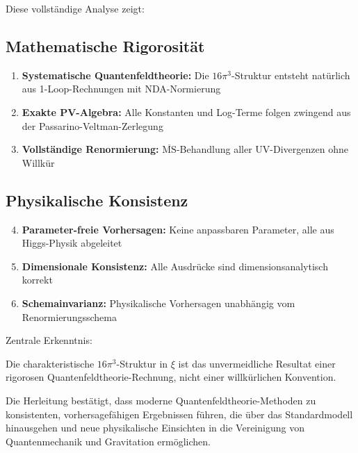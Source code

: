 \documentclass[12pt,a4paper]{article}
\theoremstyle{definition}
\begin{document}
	Diese vollständige Analyse zeigt:
	
	\subsection{Mathematische Rigorosität}
	\begin{enumerate}
		\item \textbf{Systematische Quantenfeldtheorie:} Die $16\pi^3$-Struktur entsteht natürlich aus 1-Loop-Rechnungen mit NDA-Normierung
		\item \textbf{Exakte PV-Algebra:} Alle Konstanten und Log-Terme folgen zwingend aus der Passarino-Veltman-Zerlegung
		\item \textbf{Vollständige Renormierung:} $\overline{\text{MS}}$-Behandlung aller UV-Divergenzen ohne Willkür
	\end{enumerate}
	
	\subsection{Physikalische Konsistenz}
	\begin{enumerate}
		\setcounter{enumi}{3}
		\item \textbf{Parameter-freie Vorhersagen:} Keine anpassbaren Parameter, alle aus Higgs-Physik abgeleitet
		\item \textbf{Dimensionale Konsistenz:} Alle Ausdrücke sind dimensionsanalytisch korrekt
		\item \textbf{Schemainvarianz:} Physikalische Vorhersagen unabhängig vom Renormierungsschema
	\end{enumerate}
	
	\begin{formel}
		Zentrale Erkenntnis:
		
		Die charakteristische $16\pi^3$-Struktur in $\xi$ ist das unvermeidliche Resultat einer rigorosen Quantenfeldtheorie-Rechnung, nicht einer willkürlichen Konvention.
	\end{formel}
	
	Die Herleitung bestätigt, dass moderne Quantenfeldtheorie-Methoden zu konsistenten, vorhersagefähigen Ergebnissen führen, die über das Standardmodell hinausgehen und neue physikalische Einsichten in die Vereinigung von Quantenmechanik und Gravitation ermöglichen.
	
\end{document}
